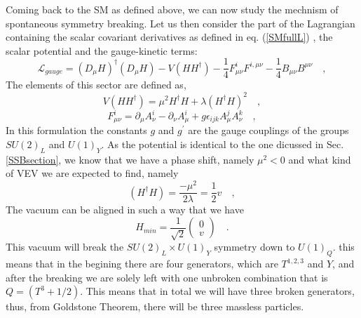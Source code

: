 \documentclass[12pt]{article}
\begin{document}

Coming back to the SM as defined above, we can now study the mechnism of spontaneous symmetry breaking. Let us then consider the part of the Lagrangian containing the scalar covariant derivatives as defined in eq. (\ref{SMfullL}) , the scalar potential and the gauge-kinetic terms:
%
\begin{equation}
\mathcal{L}_{gauge} = (D_\mu H)^\dagger (D_\mu H) - V (H H^\dagger) - \frac{1}{4} F^i_{\mu \nu} F^{i , \mu \nu} - \frac{1}{4} B_{\mu \nu} B^{\mu \nu} \quad , 
\label{iamgarbagemanyes}
\end{equation} 
The elements of this sector are defined as,
\begin{equation}
V(H H^\dagger ) = \mu^2 H^\dagger H + \lambda (H^\dagger H)^2 \quad , 
\end{equation}
\begin{equation}
 F^i_{\mu \nu}= \partial_\mu A^i_\nu - \partial_\nu A^i_\mu + g \epsilon_{ijk} A^j_\mu A^k_\nu  \quad , 
\end{equation}
%
In this formulation the constants $g$ and $g^\prime$ are the gauge couplings of the groups $SU(2)_L$ and $U(1)_Y$. 
% 
As the potential is identical to the one dicussed in Sec. \ref{SSBsection}, we know that we have a phase shift, namely $\mu^2 < 0$ and what kind of VEV we are expected to find, namely
%
\begin{equation}
(H^\dagger H) = \frac{-\mu^2}{2\lambda} = \frac{1}{2} v  \quad , 
\end{equation} 
%
The vacuum can be aligned in such a way that we have
\begin{equation}
H_{min} = \frac{1}{\sqrt{2}} \begin{pmatrix} 0 \\
v 
\end{pmatrix} \quad .
\end{equation}
This vacuum will break the $SU(2)_L \times U(1)_Y$ symmetry down to $U(1)_Q$. this means that in the begining there are four generators, which are $T^{1,2,3}$ and $Y$, and after the breaking we are solely left with one unbroken combination that is $Q =  (T^3 + 1/2)$. This means that in total we will have three broken generators, thus, from Goldstone Theorem, there will be three massless particles. 
\end{document}
